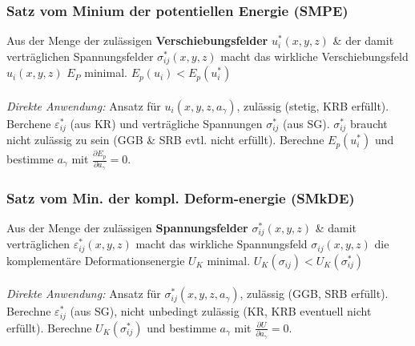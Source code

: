         \subsubsection{Satz vom Minium der potentiellen Energie (SMPE)}
            Aus der Menge der zulässigen \textbf{Verschiebungsfelder} $u_i^*(x,y,z)$ \& der damit verträglichen Spannungsfelder $\sigma_{ij}^*(x,y,z)$ macht das wirkliche Verschiebungsfeld $u_i(x,y,z)$ $E_P$ minimal. $E_p(u_i) < E_p(u_i^*)$\\\\
            \textit{Direkte Anwendung:} Ansatz für $u_i(x,y,z,a_\gamma)$, zulässig (stetig, KRB erfüllt). Berchene $\varepsilon_{ij}^*$ (aus KR) und verträgliche Spannungen $\sigma_{ij}^*$ (aus SG). $\sigma_{ij}^*$ braucht nicht zulässig zu sein (GGB \& SRB evtl. nicht erfüllt). Berechne $E_p(u_i^*)$ und bestimme $a_\gamma$ mit $\frac{\partial E_p}{\partial a_\gamma}=0$.
            
        \subsubsection{Satz vom Min. der kompl. Deform-energie (SMkDE)}
            Aus der Menge der zulässigen \textbf{Spannungsfelder} $\sigma_{ij}^*(x,y,z)$ \& damit verträglichen $\varepsilon_{ij}^*(x,y,z)$ macht das wirkliche Spannungsfeld $\sigma_{ij}(x,y,z)$ die komplementäre Deformationsenergie $U_K$ minimal. $U_K(\sigma_{ij}) < U_K(\sigma_{ij}^*)$\\\\
            \textit{Direkte Anwendung:} Ansatz für $\sigma_{ij}^*(x,y,z,a_\gamma)$, zulässig (GGB, SRB erfüllt). Berechne $\varepsilon_{ij}^*$ (aus SG), nicht unbedingt zulässig (KR, KRB eventuell nicht erfüllt). Berechne $U_K(\sigma_{ij}^*)$ und bestimme $a_\gamma$ mit $\frac{\partial U}{\partial a_\gamma}=0$.
            
